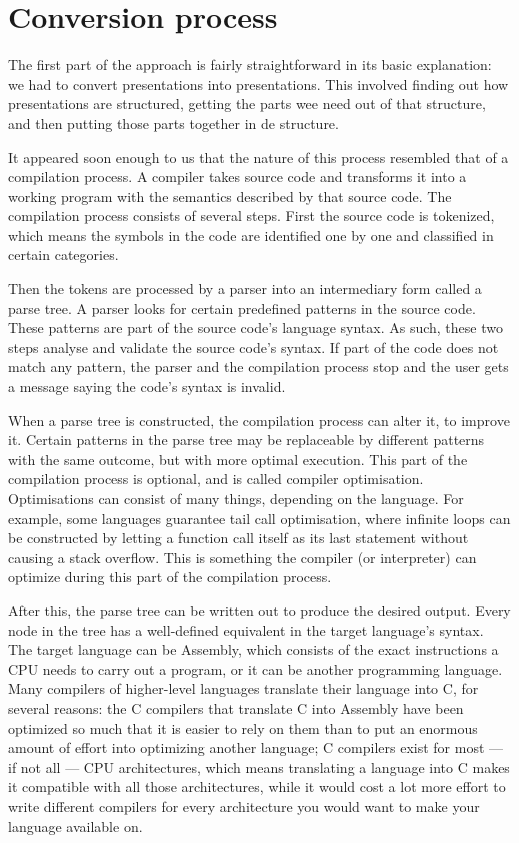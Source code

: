   \section{Conversion process}

   The first part of the approach is fairly straightforward in its basic
   explanation: we had to convert \ppt presentations into \mxp presentations.
   This involved finding out how \ppt presentations are structured, getting the
   parts wee need out of that structure, and then putting those parts together
   in de \mxp structure.

   It appeared soon enough to us that the nature of this process resembled that
   of a compilation process. A compiler takes source code and transforms it
   into a working program with the semantics described by that source code. The
   compilation process consists of several steps. First the source code is
   tokenized, which means the symbols in the code are identified one by one and
   classified in certain categories.

   Then the tokens are processed by a parser into an intermediary form called a
   parse tree. A parser looks for certain predefined patterns in the source
   code. These patterns are part of the source code's language syntax. As such,
   these two steps analyse and validate the source code's syntax. If part of
   the code does not match any pattern, the parser and the compilation process
   stop and the user gets a message saying the code's syntax is invalid.

   When a parse tree is constructed, the compilation process can alter it, to
   improve it. Certain patterns in the parse tree may be replaceable by
   different patterns with the same outcome, but with more optimal execution.
   This part of the compilation process is optional, and is called compiler
   optimisation. Optimisations can consist of many things, depending on the
   language. For example, some languages guarantee tail call optimisation,
   where infinite loops can be constructed by letting a function call itself as
   its last statement without causing a stack overflow. This is something the
   compiler (or interpreter) can optimize during this part of the compilation
   process.

   After this, the parse tree can be written out to produce the desired output.
   Every node in the tree has a well-defined equivalent in the target
   language's syntax. The target language can be Assembly, which consists of
   the exact instructions a CPU needs to carry out a program, or it can be
   another programming language. Many compilers of higher-level languages
   translate their language into C, for several reasons: the C compilers that
   translate C into Assembly have been optimized so much that it is easier to
   rely on them than to put an enormous amount of effort into optimizing
   another language; C compilers exist for most --- if not all --- CPU
   architectures, which means translating a language into C makes it compatible
   with all those architectures, while it would cost a lot more effort to write
   different compilers for every architecture you would want to make your
   language available on.

